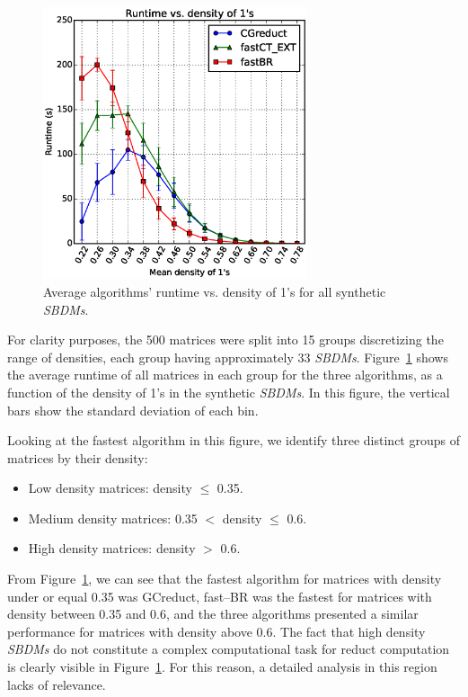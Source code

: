 \documentclass[authoryear,preprint,review,12pt]{elsarticle}
\begin{document}
	\begin{figure}[htb]
		\begin{center}
			\includegraphics[height=8cm]{overal.eps}
		\end{center}
		\caption{Average algorithms' runtime vs. density of 1's for all synthetic \textit{SBDMs}.}
		\label{fig:scattDensity}
	\end{figure}	

	For clarity purposes, the 500 matrices were split into 15 groups discretizing the range of densities, each group having approximately 33 \textit{SBDMs}. Figure~\ref{fig:scattDensity} shows the average runtime of all  matrices in each group for the three algorithms, as a function of the density of 1's in the synthetic \textit{SBDMs}. In this figure, the vertical bars show the standard deviation of each bin. 
	
	{	
	Looking at the fastest algorithm in this figure, we identify three distinct groups of matrices by their density:
	\begin{itemize}
		\item Low density matrices: density $\leq$ 0.35.
		\item Medium density matrices: 0.35 $<$ density $\leq$ 0.6.
		\item High density matrices: density $>$ 0.6.
	\end{itemize}}
		
	From Figure~\ref{fig:scattDensity}, we can see that the fastest algorithm for matrices with density under or equal 0.35 was GCreduct, fast--BR was the fastest for matrices with density between 0.35 and 0.6, and the three algorithms presented a similar performance for matrices with density above 0.6. The fact that high density \textit{SBDMs} do not constitute a complex computational task for reduct computation \citep{Rojas12} is clearly visible in Figure~\ref{fig:scattDensity}. For this reason, a detailed analysis in this region lacks of relevance.
	
\end{document}

